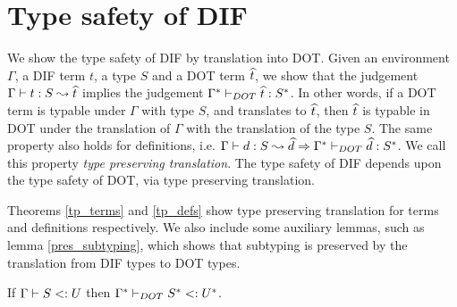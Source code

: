 \section{Type safety of DIF}

We show the type safety of DIF by translation into DOT. Given an environment
$\Gamma$, a DIF term $t$, a type $S$ and a DOT term $\widehat{t}$, we show that the
judgement $\Gamma \vdash t: S \leadsto \widehat{t}$ implies the judgement
$\Gamma^{*} \vdash_{DOT} \widehat{t}: S^{*}$. In other words, if a DOT term is
typable under $\Gamma$ with type $S$, and translates to $\widehat{t}$, then
$\widehat{t}$ is typable in DOT under the translation of $\Gamma$ with the
translation of the type $S$. The same property also holds for definitions, i.e.
$\Gamma \vdash d: S \leadsto \widehat{d} \Rightarrow
\Gamma^{*} \vdash_{DOT} \widehat{d}: S^{*}$. We call this property \emph{type
preserving translation}. The type safety of DIF depends upon the type safety of
DOT, via type preserving translation.

Theorems \ref{tp_terms} and \ref{tp_defs} show type preserving translation for
terms and definitions respectively. We also include some auxiliary lemmas, such
as lemma \ref{pres_subtyping}, which shows that subtyping is preserved by the
translation from DIF types to DOT types.

\begin{LEMMA}
    \label{pres_subtyping}
    If $\Gamma \vdash S <: U$ then $\Gamma^{*} \vdash_{DOT} S^{*} <: U^{*}$.
\end{LEMMA}

